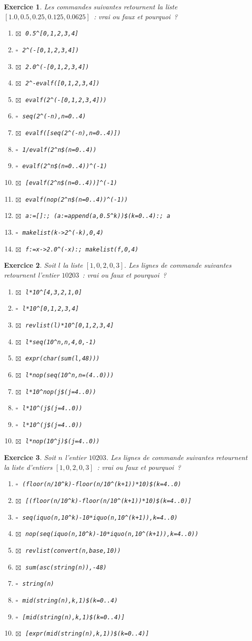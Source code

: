 \documentclass{article}
\newcommand{\faux}{$\square\;$}
\newcommand{\vrai}{$\boxtimes\;$}
\newcommand{\itemf}{\item\faux}
\newcommand{\itemvv}{\item\vrai}
\newtheorem{exo}{Exercice}[section]
\begin{document}
\begin{exo}{\rm
Les commandes suivantes retournent la liste
$[1.0,0.5,0.25,0.125,0.0625]$~: 
vrai ou faux et pourquoi~?
\begin{enumerate}
\itemvv
\verb|0.5^[0,1,2,3,4]|
\itemf
\verb|2^(-[0,1,2,3,4])|
\itemvv
\verb|2.0^(-[0,1,2,3,4])|
\itemvv
\verb|2^-evalf([0,1,2,3,4])|
\itemvv
\verb|evalf(2^(-[0,1,2,3,4]))|
\itemf
\verb|seq(2^(-n),n=0..4)|
\itemvv
\verb|evalf([seq(2^(-n),n=0..4)])|
\itemf
\verb|1/evalf(2^n$(n=0..4))|
\itemf
\verb|evalf(2^n$(n=0..4))^(-1)|
\itemvv
\verb|[evalf(2^n$(n=0..4))]^(-1)|
\itemvv
\verb|evalf(nop(2^n$(n=0..4))^(-1))|
\itemvv
\verb|a:=[]:; (a:=append(a,0.5^k))$(k=0..4):; a|
\itemf
\verb|makelist(k->2^(-k),0,4)|
\itemvv
\verb|f:=x->2.0^(-x):; makelist(f,0,4)|
\end{enumerate}
}\end{exo}
\begin{exo}{\rm
Soit $l$ la liste $[1,0,2,0,3]$. Les lignes de commande 
suivantes retournent l'entier $10203$~: vrai ou faux et pourquoi~? 
\begin{enumerate}
\itemvv
\verb|l*10^[4,3,2,1,0]|
\itemf
\verb|l*10^[0,1,2,3,4]|
\itemvv
\verb|revlist(l)*10^[0,1,2,3,4]|
\itemvv
\verb|l*seq(10^n,n,4,0,-1)|
\itemvv
\verb|expr(char(sum(l,48)))|
\itemvv
\verb|l*nop(seq(10^n,n=(4..0)))|
\itemvv
\verb|l*10^nop(j$(j=4..0))|
\itemf
\verb|l*10^(j$(j=4..0))|
\itemf
\verb|l*10^(j$(j=4..0))|
\itemvv
\verb|l*nop(10^j)$(j=4..0))|
\end{enumerate}
}\end{exo}
\begin{exo}{\rm
Soit $n$ l'entier $10203$.
Les lignes de commande suivantes retournent la
liste d'entiers $[1,0,2,0,3]$~: 
vrai ou faux et pourquoi~? 
\begin{enumerate}
\itemf
\verb|(floor(n/10^k)-floor(n/10^(k+1))*10)$(k=4..0)|
\itemvv
\verb|[(floor(n/10^k)-floor(n/10^(k+1))*10)$(k=4..0)]|
\itemf
\verb|seq(iquo(n,10^k)-10*iquo(n,10^(k+1)),k=4..0)|
\itemvv
\verb|nop(seq(iquo(n,10^k)-10*iquo(n,10^(k+1)),k=4..0))|
\itemvv
\verb|revlist(convert(n,base,10))|
\itemvv
\verb|sum(asc(string(n)),-48)|
\itemf
\verb|string(n)|
\itemf
\verb|mid(string(n),k,1)$(k=0..4)|
\itemf
\verb|[mid(string(n),k,1)$(k=0..4)]|
\itemvv
\verb|[expr(mid(string(n),k,1))$(k=0..4)]|
\end{enumerate}
}\end{exo}
\end{document}

